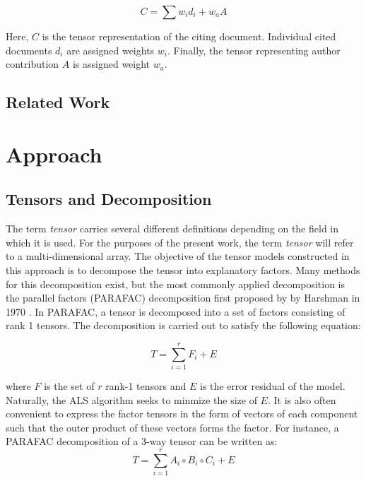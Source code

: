 \documentclass{article}
\begin{document}
\begin{equation}
    \label{eq:model}
    C = \sum w_id_i + w_a A
\end{equation}

Here, $C$ is the tensor representation of the citing document.
Individual cited documents $d_i$ are assigned weights $w_i$.  Finally,
the tensor representing author contribution $A$ is assigned weight
$w_a$.  

\subsection{Related Work}

\section{Approach}
\subsection{Tensors and Decomposition}
The term {\em tensor} carries several different definitions depending
on the field in which it is used.  For the purposes of the present
work, the term {\em tensor} will refer to a multi-dimensional array.
The objective of the tensor models constructed in this approach is to
decompose the tensor into explanatory factors.  Many methods for this
decomposition exist, but the most commonly applied decomposition is
the parallel factors (PARAFAC) decomposition first proposed by by
Harshman in 1970 \cite{harshman1970}.  In PARAFAC, a tensor is
decomposed into a set of factors consisting of rank 1 tensors.  The
decomposition is carried out to satisfy the following equation:

\begin{equation}
    \label{eq:parafac}
    T = \displaystyle\sum_{i=1}^{r} F_i + E
\end{equation}

where $F$ is the set of $r$ rank-1 tensors and $E$ is the error
residual of the model.  Naturally, the ALS algorithm seeks to minmize
the size of $E$.  It is also often convenient to express the factor
tensors in the form of vectors of each component such that the outer
product of these vectors forms the factor.  For instance,
a PARAFAC decomposition of a 3-way tensor can be written as:
\begin{equation}
    \label{eq:parafac-comp}
    T = \displaystyle\sum_{i=1}^{r} A_i \circ B_i \circ C_i + E
\end{equation}
\end{document}
